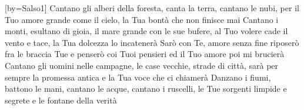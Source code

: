 [by={Salso1}]
\beginverse
Cantano gli alberi della foresta,
canta la terra, cantano le nubi,
per il Tuo amore grande come il cielo,
la Tua bontà che non finisce mai
Cantano i monti, esultano di gioia,
il mare grande con le sue bufere,
al Tuo volere cade il vento e tace,
la Tua dolcezza lo incatenerà
\endverse
\beginchorus
Sarò con Te, amore senza fine
riposerò fra le braccia Tue
e penserò coi Tuoi pensieri
ed il Tuo amore poi mi brucierà
\endchorus
\beginverse
Cantano gli uomini nelle campagne,
le case vecchie, strade di città,
sarà per sempre la promessa antica
e la Tua voce che ci chiamerà
Danzano i fiumi, battono le mani,
cantano le acque, cantano i ruscelli,
le Tue sorgenti limpide e segrete
e le fontane della verità
\endverse
\endsong
